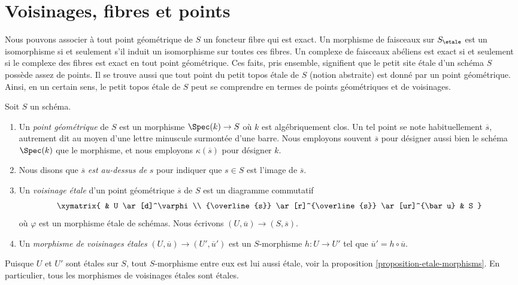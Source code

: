 \section{Voisinages, fibres et points}
\label{section-stalks}

\noindent
Nous pouvons associer \`a tout point g\'eom\'etrique de $S$ un foncteur fibre qui est
exact. Un morphisme de faisceaux sur $S_\etale$ est un isomorphisme si et seulement
s'il
induit un isomorphisme sur toutes ces fibres. Un complexe de faisceaux ab\'eliens est
exact si et seulement si le complexe des fibres est exact en tout point g\'eom\'etrique.
Ces faits, pris ensemble, signifient que le petit site \'etale d'un sch\'ema $S$
poss\`ede assez de points. Il se trouve aussi que tout point du petit topos \'etale
de $S$ (notion abstraite) est donn\'e par un point g\'eom\'etrique.
Ainsi, en un certain sens, le petit topos \'etale de $S$ peut se comprendre en
termes de points g\'eom\'etriques et de voisinages.

\begin{definition}
\label{definition-geometric-point}
Soit $S$ un sch\'ema.
\begin{enumerate}
\item Un {\it point g\'eom\'etrique} de $S$ est un morphisme
$\Spec(k) \to S$ o\`u $k$ est alg\'ebriquement clos.
Un tel point se note habituellement $\overline{s}$, autrement dit au moyen d'une
lettre minuscule surmont\'ee d'une barre. Nous employons souvent $\overline{s}$ pour d\'esigner aussi bien le sch\'ema
$\Spec(k)$ que le morphisme, et nous employons $\kappa(\overline{s})$
pour d\'esigner $k$.
\item Nous disons que $\overline{s}$ {\it est au-dessus de} $s$
pour indiquer que $s \in S$ est l'image de $\overline{s}$.
\item Un {\it voisinage \'etale} d'un point g\'eom\'etrique $\overline{s}$
de $S$ est un diagramme commutatif
$$
\xymatrix{
& U \ar[d]^\varphi \\
{\overline{s}} \ar[r]^{\overline{s}} \ar[ur]^{\bar u} & S
}
$$
o\`u $\varphi$ est un morphisme \'etale de sch\'emas.
Nous \'ecrivons $(U, \overline{u}) \to (S, \overline{s})$.
\item Un {\it morphisme de voisinages \'etales}
$(U, \overline{u}) \to (U', \overline{u}')$
est un $S$-morphisme $h: U \to U'$
tel que $\overline{u}' = h \circ \overline{u}$.
\end{enumerate}
\end{definition}

\begin{remark}
\label{remark-etale-between-etale}
Puisque $U$ et $U'$ sont \'etales sur $S$, tout $S$-morphisme
entre eux est lui aussi \'etale, voir la
proposition \ref{proposition-etale-morphisms}.
En particulier, tous les morphismes de voisinages \'etales sont \'etales.
\end{remark}


